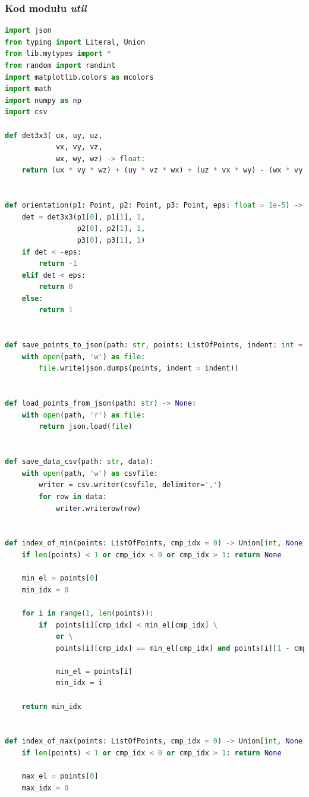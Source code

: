\documentclass[11pt]{article}
\theoremstyle{remark} \newtheorem{definition}{def.}
\theoremstyle{definition} \newtheorem{twierdzenie}{tw.}
\begin{document}
\subsubsection*{Kod modułu \emph{util}}
\begin{lstlisting}[language=Python]
import json
from typing import Literal, Union
from lib.mytypes import *
from random import randint
import matplotlib.colors as mcolors
import math
import numpy as np
import csv

def det3x3( ux, uy, uz,
            vx, vy, vz,
            wx, wy, wz) -> float:
    return (ux * vy * wz) + (uy * vz * wx) + (uz * vx * wy) - (wx * vy * uz) - (wy * vz * ux) - (wz * vx * uy)


def orientation(p1: Point, p2: Point, p3: Point, eps: float = 1e-5) -> Literal[-1, 0, 1]:
    det = det3x3(p1[0], p1[1], 1,
                 p2[0], p2[1], 1,
                 p3[0], p3[1], 1)
    if det < -eps:
        return -1
    elif det < eps:
        return 0
    else:
        return 1

    
def save_points_to_json(path: str, points: ListOfPoints, indent: int = None) -> None:
    with open(path, 'w') as file:
        file.write(json.dumps(points, indent = indent)) 
    

def load_points_from_json(path: str) -> None:
    with open(path, 'r') as file:
        return json.load(file)

        
def save_data_csv(path: str, data):
    with open(path, 'w') as csvfile:
        writer = csv.writer(csvfile, delimiter=',')
        for row in data:
            writer.writerow(row)
        
        
def index_of_min(points: ListOfPoints, cmp_idx = 0) -> Union[int, None]:
    if len(points) < 1 or cmp_idx < 0 or cmp_idx > 1: return None

    min_el = points[0]
    min_idx = 0

    for i in range(1, len(points)):
        if  points[i][cmp_idx] < min_el[cmp_idx] \
            or \
            points[i][cmp_idx] == min_el[cmp_idx] and points[i][1 - cmp_idx] < min_el[1 - cmp_idx]:
                
            min_el = points[i]
            min_idx = i
        
    return min_idx


def index_of_max(points: ListOfPoints, cmp_idx = 0) -> Union[int, None]:
    if len(points) < 1 or cmp_idx < 0 or cmp_idx > 1: return None
    
    max_el = points[0]  
    max_idx = 0
    

\end{lstlisting}
\end{document}
